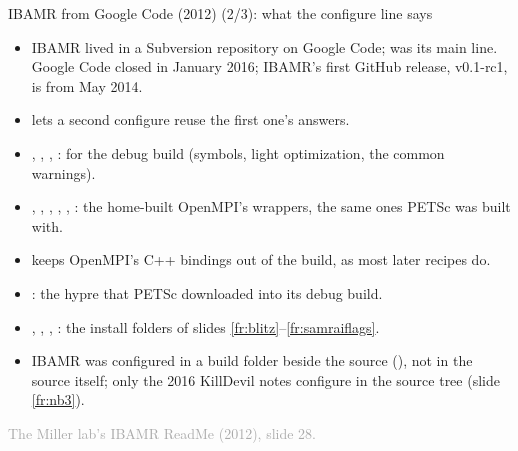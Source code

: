 \documentclass[aspectratio=169,11pt]{beamer}
\newcommand{\sourcecredit}[1]{\vfill\begin{flushright}\tiny\textcolor{DarkGray}{#1}\end{flushright}}
\begin{document}
\begin{frame}{IBAMR from Google Code (2012) (2/3): what the configure line says}
\label{fr:ibamr2012x}
\footnotesize
\begin{itemize}\setlength{\itemsep}{3pt}
  \item IBAMR lived in a Subversion repository on Google Code;  was its main line. Google Code closed in January 2016; IBAMR's first GitHub release, v0.1-rc1, is from May 2014.
  \item {} lets a second configure reuse the first one's answers.
  \item {}, , , :  for the debug build (symbols, light optimization, the common warnings).
  \item {}, , , , , : the home-built OpenMPI's wrappers, the same ones PETSc was built with.
  \item {} keeps OpenMPI's C++ bindings out of the build, as most later recipes do.
  \item {}: the hypre that PETSc downloaded into its debug build.
  \item {}, , , : the install folders of slides \ref{fr:blitz}--\ref{fr:samraiflags}.
  \item IBAMR was configured in a build folder beside the source (), not in the source itself; only the 2016 KillDevil notes configure in the source tree (slide \ref{fr:nb3}).
\end{itemize}
\sourcecredit{The Miller lab's IBAMR ReadMe (2012), slide 28.}
\end{frame}
\end{document}
